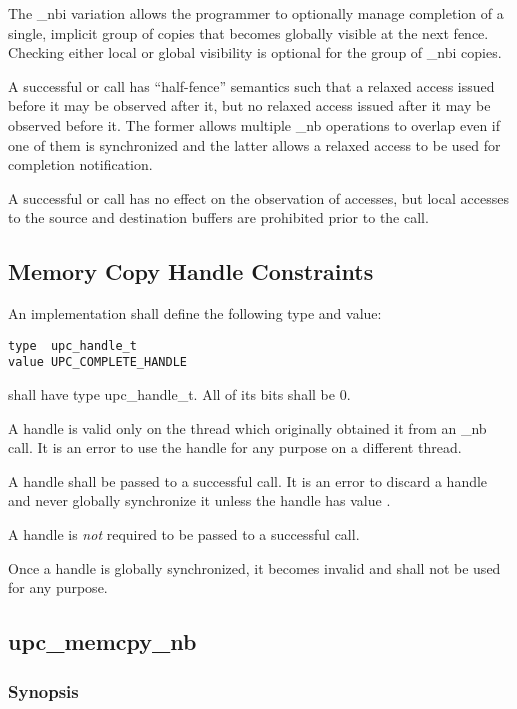 \np The \_nbi variation allows the programmer to optionally manage
completion of a single, implicit group of copies that becomes globally
visible at the next fence.  Checking either local or global visibility
is optional for the group of \_nbi copies.

\np A successful \gsync{} or \gsynci{} call has ``half-fence'' semantics
such that a relaxed access issued before it may be observed after
it, but no relaxed access issued after it may be observed before it.
The former allows multiple \_nb operations to overlap even if one of
them is synchronized and the latter allows a relaxed access to be used
for completion notification.

\np A successful \lsync{} or \lsynci{} call has no effect on the observation of
accesses, but local accesses to the source and destination buffers are
prohibited prior to the call.

\subsection{Memory Copy Handle Constraints}
\setcounter{secnumdepth}{4}

\npf An implementation shall define the following type and value:

\begin{verbatim}
type  upc_handle_t
value UPC_COMPLETE_HANDLE
\end{verbatim}

\np \complete{} shall have type upc\_handle\_t.  All of its bits shall be 0.

\np A handle is valid only on the thread which originally obtained it from an
\_nb call.  It is an error to use the handle for any purpose on a different
thread.

\np A handle shall be passed to a successful \gsync{} call.  It is an error to
discard a handle and never globally synchronize it unless the handle has value
\complete{}. 

\np A handle is {\em not} required to be passed to a successful \lsync{} call.

\np Once a handle is globally synchronized, it becomes invalid and shall not be
used for any purpose.

\newpage
\subsection{upc\_memcpy\_nb}
\def\function{{\tt upc\_memcpy\_nb}}

\subsubsection{Synopsis}

